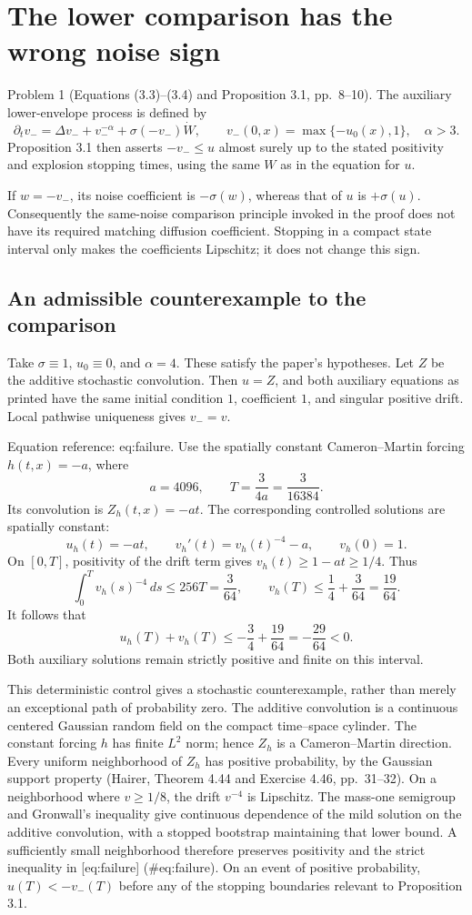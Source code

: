 \documentclass[10pt]{article}
\begin{document}
\section*{The lower comparison has the wrong noise sign}
Problem 1 (Equations (3.3)–(3.4) and Proposition 3.1, pp. 8–10).  The auxiliary lower-envelope process is defined by \[\partial_t v_-=\Delta v_-+v_-^{-\alpha}
                   +\sigma(-v_-)\dot W,\qquad
 v_-(0,x)=\max\{-u_0(x),1\},\quad\alpha>3.\] Proposition 3.1 then asserts \(-v_-\le u\) almost surely up to the stated positivity and explosion stopping times, using the same \(W\) as in the equation for \(u\).\par
If \(w=-v_-\), its noise coefficient is \(-\sigma(w)\), whereas that of \(u\) is \(+\sigma(u)\). Consequently the same-noise comparison principle invoked in the proof does not have its required matching diffusion coefficient. Stopping in a compact state interval only makes the coefficients Lipschitz; it does not change this sign.\par
\subsection*{An admissible counterexample to the comparison}
Take \(\sigma\equiv1\), \(u_0\equiv0\), and \(\alpha=4\). These satisfy the paper’s hypotheses. Let \(Z\) be the additive stochastic convolution. Then \(u=Z\), and both auxiliary equations as printed have the same initial condition \(1\), coefficient \(1\), and singular positive drift. Local pathwise uniqueness gives \(v_-=v\).\par
Equation reference: eq:failure. Use the spatially constant Cameron–Martin forcing \(h(t,x)=-a\), where \[a=4096,\qquad T=\frac{3}{4a}=\frac{3}{16384}.\] Its convolution is \(Z_h(t,x)=-at\). The corresponding controlled solutions are spatially constant: \[u_h(t)=-at,\qquad v_h'(t)=v_h(t)^{-4}-a,\qquad v_h(0)=1.\] On \([0,T]\), positivity of the drift term gives \(v_h(t)\ge1-at\ge1/4\). Thus \[\int_0^T v_h(s)^{-4}\,ds\le256T=\frac{3}{64},
 \qquad
 v_h(T)\le\frac14+\frac{3}{64}=\frac{19}{64}.\] It follows that \[
 u_h(T)+v_h(T)\le-\frac34+\frac{19}{64}
                    =-\frac{29}{64}<0.\] Both auxiliary solutions remain strictly positive and finite on this interval.\par
This deterministic control gives a stochastic counterexample, rather than merely an exceptional path of probability zero. The additive convolution is a continuous centered Gaussian random field on the compact time–space cylinder. The constant forcing \(h\) has finite \(L^2\) norm; hence \(Z_h\) is a Cameron–Martin direction. Every uniform neighborhood of \(Z_h\) has positive probability, by the Gaussian support property (Hairer, Theorem 4.44 and Exercise 4.46, pp. 31–32). On a neighborhood where \(v\ge1/8\), the drift \(v^{-4}\) is Lipschitz. The mass-one semigroup and Gronwall’s inequality give continuous dependence of the mild solution on the additive convolution, with a stopped bootstrap maintaining that lower bound. A sufficiently small neighborhood therefore preserves positivity and the strict inequality in [eq:failure] (\#eq:failure). On an event of positive probability, \(u(T)<-v_-(T)\) before any of the stopping boundaries relevant to Proposition 3.1.\par
\end{document}
